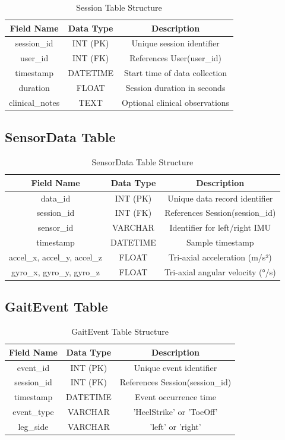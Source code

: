 \documentclass[12pt,a4paper]{report}
\begin{document}
\begin{table}[H]
\centering
\caption{Session Table Structure}
\begin{tabular}{|c|c|c|}
\hline
\textbf{Field Name} & \textbf{Data Type} & \textbf{Description} \\
\hline
session\_id & INT (PK) & Unique session identifier \\
user\_id & INT (FK) & References User(user\_id) \\
timestamp & DATETIME & Start time of data collection \\
duration & FLOAT & Session duration in seconds \\
clinical\_notes & TEXT & Optional clinical observations \\
\hline
\end{tabular}
\end{table}

\subsection*{SensorData Table}

\begin{table}[H]
\centering
\caption{SensorData Table Structure}
\begin{tabular}{|c|c|c|}
\hline
\textbf{Field Name} & \textbf{Data Type} & \textbf{Description} \\
\hline
data\_id & INT (PK) & Unique data record identifier \\
session\_id & INT (FK) & References Session(session\_id) \\
sensor\_id & VARCHAR & Identifier for left/right IMU \\
timestamp & DATETIME & Sample timestamp \\
accel\_x, accel\_y, accel\_z & FLOAT & Tri-axial acceleration (m/s²) \\
gyro\_x, gyro\_y, gyro\_z & FLOAT & Tri-axial angular velocity (°/s) \\
\hline
\end{tabular}
\end{table}

\subsection*{GaitEvent Table}

\begin{table}[H]
\centering
\caption{GaitEvent Table Structure}
\begin{tabular}{|c|c|c|}
\hline
\textbf{Field Name} & \textbf{Data Type} & \textbf{Description} \\
\hline
event\_id & INT (PK) & Unique event identifier \\
session\_id & INT (FK) & References Session(session\_id) \\
timestamp & DATETIME & Event occurrence time \\
event\_type & VARCHAR & 'HeelStrike' or 'ToeOff' \\
leg\_side & VARCHAR & 'left' or 'right' \\
\hline
\end{tabular}
\end{table}
\end{document}
